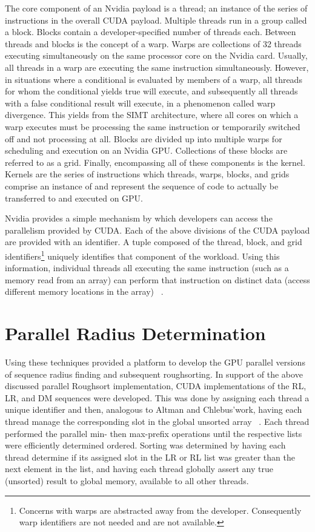 \documentclass[letterpaper, 12pt]{article}
\let\supercite\cite
\renewcommand{\cite}[1]{\textnormal{~\supercite{#1}}}
\begin{document}
  The core component of an Nvidia payload is a thread; an instance of the series of instructions in the overall CUDA payload.  Multiple threads run in a group called a block.  Blocks contain a developer-specified number of threads each.  Between threads and blocks is the concept of a warp.  Warps are collections of 32 threads executing simultaneously on the same processor core on the Nvidia card.  Usually, all threads in a warp are executing the same instruction simultaneously. However, in situations where a conditional is evaluated by members of a warp, all threads for whom the conditional yields true will execute, and subsequently all threads with a false conditional result will execute, in a phenomenon called warp divergence.  This yields from the SIMT architecture, where all cores on which a warp executes must be processing the same instruction or temporarily switched off and not processing at all.  Blocks are divided up into multiple warps for scheduling and execution on an Nvidia GPU.  Collections of these blocks are referred to as a grid.  Finally, encompassing all of these components is the kernel.  Kernels are the series of instructions which threads, warps, blocks, and grids comprise an instance of and represent the sequence of code to actually be transferred to and executed on GPU.

  Nvidia provides a simple mechanism by which developers can access the parallelism provided by CUDA.  Each of the above divisions of the CUDA payload are provided with an identifier.  A tuple composed of the thread, block, and grid identifiers\footnote{Concerns with warps are abstracted away from the developer.  Consequently warp identifiers are not needed and are not available.} uniquely identifies that component of the workload.  Using this information, individual threads all executing the same instruction (such as a memory read from an array) can perform that instruction on distinct data (access different memory locations in the array) \cite{cuda}.


\section{Parallel Radius Determination}

  Using these techniques provided a platform to develop the GPU parallel versions of sequence radius finding and subsequent roughsorting.  In support of the above discussed parallel Roughsort implementation, CUDA implementations of the RL, LR, and DM sequences were developed.  This was done by assigning each thread a unique identifier and then, analogous to Altman and Chlebus\textquoteright work, having each thread manage the corresponding slot in the global unsorted array \cite{altman89}.  Each thread performed the parallel min- then max-prefix operations until the respective lists were efficiently determined ordered.  Sorting was determined by having each thread determine if its assigned slot in the LR or RL list was greater than the next element in the list, and having each thread globally assert any true (unsorted) result to global memory, available to all other threads.
\end{document}
